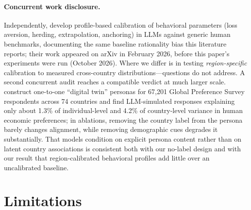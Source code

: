 \documentclass[10pt,letterpaper]{article}
\begin{document}
\paragraph{Concurrent work disclosure.}
Independently, \citet{yee2026} develop profile-based calibration of
behavioral parameters (loss aversion, herding, extrapolation, anchoring)
in LLMs against generic human benchmarks, documenting the same baseline
rationality bias this literature reports; their work appeared on arXiv in
February 2026, before this paper's experiments were run (October 2026).
Where we differ is in testing \textit{region-specific} calibration to
measured cross-country distributions---questions \citet{yee2026} do not
address. A second concurrent audit reaches a compatible verdict at much
larger scale. \citet{chen2026} construct one-to-one ``digital twin''
personas for 67,201 Global Preference Survey respondents across 74
countries and find LLM-simulated responses explaining only about 1.3\% of
individual-level and 4.2\% of country-level variance in human economic
preferences; in ablations, removing the country label from the persona
barely changes alignment, while removing demographic cues degrades it
substantially. That models condition on explicit persona content rather
than on latent country associations is consistent both with our no-label
design and with our result that region-calibrated behavioral profiles add
little over an uncalibrated baseline.

\section{Limitations}
\end{document}
